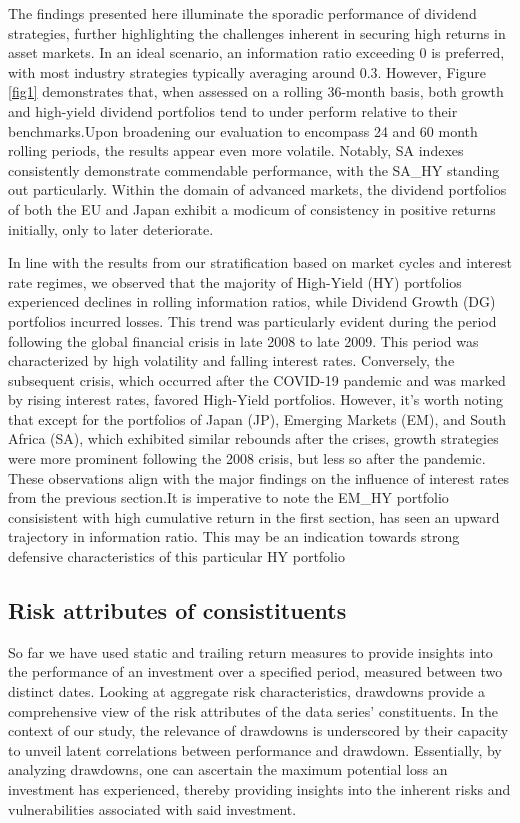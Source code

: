 \documentclass[12pt,preprint, authoryear]{elsarticle}
\numberwithin{equation}{section}
\numberwithin{figure}{section}
\numberwithin{table}{section}
\begin{document}
The findings presented here illuminate the sporadic performance of
dividend strategies, further highlighting the challenges inherent in
securing high returns in asset markets. In an ideal scenario, an
information ratio exceeding 0 is preferred, with most industry
strategies typically averaging around 0.3. However, Figure \ref{fig1}
demonstrates that, when assessed on a rolling 36-month basis, both
growth and high-yield dividend portfolios tend to under perform relative
to their benchmarks.Upon broadening our evaluation to encompass 24 and
60 month rolling periods, the results appear even more volatile.
Notably, SA indexes consistently demonstrate commendable performance,
with the SA\_HY standing out particularly. Within the domain of advanced
markets, the dividend portfolios of both the EU and Japan exhibit a
modicum of consistency in positive returns initially, only to later
deteriorate.

In line with the results from our stratification based on market cycles
and interest rate regimes, we observed that the majority of High-Yield
(HY) portfolios experienced declines in rolling information ratios,
while Dividend Growth (DG) portfolios incurred losses. This trend was
particularly evident during the period following the global financial
crisis in late 2008 to late 2009. This period was characterized by high
volatility and falling interest rates. Conversely, the subsequent
crisis, which occurred after the COVID-19 pandemic and was marked by
rising interest rates, favored High-Yield portfolios. However, it's
worth noting that except for the portfolios of Japan (JP), Emerging
Markets (EM), and South Africa (SA), which exhibited similar rebounds
after the crises, growth strategies were more prominent following the
2008 crisis, but less so after the pandemic. These observations align
with the major findings on the influence of interest rates from the
previous section.It is imperative to note the EM\_HY portfolio
consisistent with high cumulative return in the first section, has seen
an upward trajectory in information ratio. This may be an indication
towards strong defensive characteristics of this particular HY portfolio

\hypertarget{risk-attributes-of-consistituents}{%
\subsection{Risk attributes of
consistituents}\label{risk-attributes-of-consistituents}}

So far we have used static and trailing return measures to provide
insights into the performance of an investment over a specified period,
measured between two distinct dates. Looking at aggregate risk
characteristics, drawdowns provide a comprehensive view of the risk
attributes of the data series' constituents. In the context of our
study, the relevance of drawdowns is underscored by their capacity to
unveil latent correlations between performance and drawdown.
Essentially, by analyzing drawdowns, one can ascertain the maximum
potential loss an investment has experienced, thereby providing insights
into the inherent risks and vulnerabilities associated with said
investment.
\end{document}
